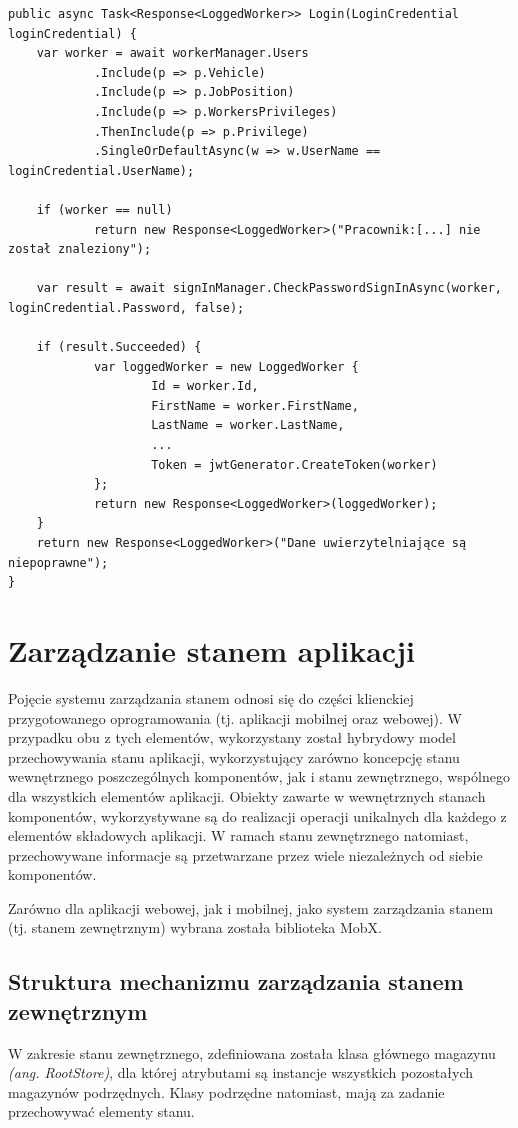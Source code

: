 \begin{lstlisting}[label=lst:service-login,caption=Kod metody klasy serwisu realizującego procedurę logowania, captionpos=b,basicstyle=\footnotesize\ttfamily,style=sharpcstyle,language={[Sharp]C}]
public async Task<Response<LoggedWorker>> Login(LoginCredential loginCredential) {
	var worker = await workerManager.Users
			.Include(p => p.Vehicle)
			.Include(p => p.JobPosition)
			.Include(p => p.WorkersPrivileges)
			.ThenInclude(p => p.Privilege)
			.SingleOrDefaultAsync(w => w.UserName == loginCredential.UserName);

	if (worker == null)
			return new Response<LoggedWorker>("Pracownik:[...] nie został znaleziony");

	var result = await signInManager.CheckPasswordSignInAsync(worker, loginCredential.Password, false);

	if (result.Succeeded) {
			var loggedWorker = new LoggedWorker {
					Id = worker.Id,
					FirstName = worker.FirstName,
					LastName = worker.LastName,
					...
					Token = jwtGenerator.CreateToken(worker)
			};
			return new Response<LoggedWorker>(loggedWorker);
	}
	return new Response<LoggedWorker>("Dane uwierzytelniające są niepoprawne");
}
\end{lstlisting}
\section{Zarządzanie stanem aplikacji}
\label{sec:zarzadzanie-stanem}
Pojęcie systemu zarządzania stanem odnosi się do części klienckiej przygotowanego oprogramowania (tj. aplikacji mobilnej oraz webowej). W przypadku obu z tych elementów, wykorzystany został hybrydowy model przechowywania stanu aplikacji, wykorzystujący zarówno koncepcję stanu wewnętrznego poszczególnych komponentów, jak i stanu zewnętrznego, wspólnego dla wszystkich elementów aplikacji. Obiekty zawarte w wewnętrznych stanach komponentów, wykorzystywane są do realizacji operacji unikalnych dla każdego z elementów składowych aplikacji. W ramach stanu zewnętrznego natomiast, przechowywane informacje są przetwarzane przez wiele niezależnych od siebie komponentów.  

Zarówno dla aplikacji webowej, jak i mobilnej, jako system zarządzania stanem (tj. stanem zewnętrznym) wybrana została biblioteka MobX.

\subsection{Struktura mechanizmu zarządzania stanem zewnętrznym}
W zakresie stanu zewnętrznego, zdefiniowana została klasa głównego magazynu \textit{(ang. RootStore)}, dla której atrybutami są instancje wszystkich pozostałych magazynów podrzędnych. Klasy podrzędne natomiast, mają za zadanie przechowywać elementy stanu.

